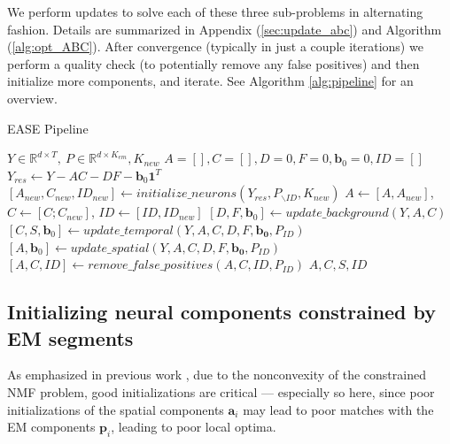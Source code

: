 \documentclass[10pt,letterpaper]{article}
\begin{document}
{%

We perform updates to solve each of these three sub-problems in alternating fashion. Details are summarized in Appendix (\ref{sec:update_abc}) and Algorithm (\ref{alg:opt_ABC}). After convergence (typically in just a couple iterations) we perform a quality check (to potentially remove any false positives) and then initialize more components, and iterate.  See Algorithm \ref{alg:pipeline} for an overview. 

\begin{algorithm}[t!]
\caption{EASE Pipeline}\label{alg:pipeline}
\begin{algorithmic}[1]
\Require $Y\in \mathbb{R}^{d\times T}, ~P\in \mathbb{R}^{d\times K_{em}}, K_{new} $ 
\State $A=[], C=[], D = 0, F =0, \bm{b}_0=0, ID=[]$
	\State {}
	\State $Y_{res} \leftarrow Y-AC-DF-\bm{b}_0\bm{1}^T$
	\State $[A_{new}, C_{new}, ID_{new}] \leftarrow initialize\_neurons(Y_{res}, P_{\backslash ID}, K_{new})$
	\State $A \leftarrow [A, A_{new}]$,  $C \leftarrow [C; C_{new}]$, $ID \leftarrow [ID, ID_{new}]$
	\State {}
		\State $[D, F, \bm{b}_0] \leftarrow update\_background(Y, A, C)$
		\State $ [C, S, \bm{b}_0] \leftarrow update\_temporal(Y, A, C, D, F, \bm{b_0}, P_{ID})$	
		\State $ [A, \bm{b}_0] \leftarrow update\_spatial(Y, A, C, D, F, \bm{b_0}, P_{ID})$
        \EndWhile
	\State {}
	\State $[A, C, ID] \leftarrow remove\_false\_positives(A, C, ID, P_{ID})$
\EndWhile
\State 
\Return $A, C, S, ID$
\end{algorithmic}

\end{algorithm}


\subsection{Initializing neural components constrained by EM segments}
As emphasized in previous work \citep{Pnevmatikakis2016,Zhou2018}, due to the nonconvexity of the constrained NMF problem, good initializations are critical --- especially so here, since poor initializations of the spatial components $\bm{a}_i$  may lead to poor matches with the EM components $\bm{p}_i$, leading to poor local optima. 

}
\end{document}
